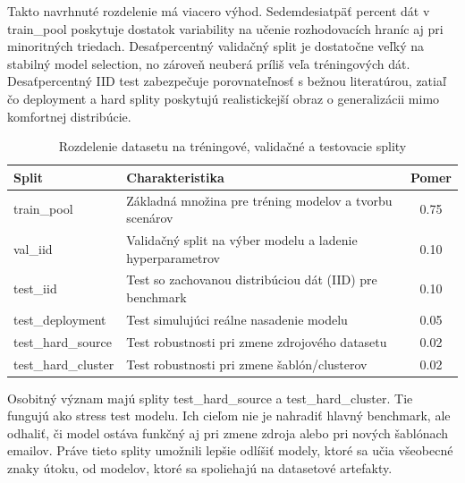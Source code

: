 \documentclass[conference]{IEEEtran}
\begin{document}
Takto navrhnuté rozdelenie má viacero výhod. Sedemdesiatpäť percent dát v train\_pool poskytuje dostatok variability na učenie rozhodovacích hraníc aj pri minoritných triedach. Desaťpercentný validačný split je dostatočne veľký na stabilný model selection, no zároveň neuberá príliš veľa tréningových dát. Desaťpercentný IID test zabezpečuje porovnateľnosť s bežnou literatúrou, zatiaľ čo deployment a hard splity poskytujú realistickejší obraz o generalizácii mimo komfortnej distribúcie.
\begin{table}[H]
\centering
\caption{Rozdelenie datasetu na tréningové, validačné a testovacie splity}
\label{tab:split_design}
\footnotesize
\setlength{\tabcolsep}{3pt}
\renewcommand{\arraystretch}{1.1}
\begin{tabular}{|l|p{4.8cm}|c|}
\hline
\textbf{Split} & \textbf{Charakteristika} & \textbf{Pomer} \\
\hline
train\_pool & Základná množina pre tréning modelov a tvorbu scenárov & 0.75 \\
val\_iid & Validačný split na výber modelu a ladenie hyperparametrov & 0.10 \\
test\_iid & Test so zachovanou distribúciou dát (IID) pre benchmark & 0.10 \\
test\_deployment & Test simulujúci reálne nasadenie modelu & 0.05 \\
test\_hard\_source & Test robustnosti pri zmene zdrojového datasetu & 0.02 \\
test\_hard\_cluster & Test robustnosti pri zmene šablón/clusterov & 0.02 \\
\hline
\end{tabular}
\end{table}

Osobitný význam majú splity test\_hard\_source a test\_hard\_cluster. Tie fungujú ako stress test modelu. Ich cieľom nie je nahradiť hlavný benchmark, ale odhaliť, či model ostáva funkčný aj pri zmene zdroja alebo pri nových šablónach emailov. Práve tieto splity umožnili lepšie odlíšiť modely, ktoré sa učia všeobecné znaky útoku, od modelov, ktoré sa spoliehajú na datasetové artefakty.
\end{document}
